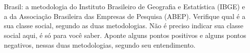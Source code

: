 \chapter{} %

Brasil: a metodologia do Instituto Brasileiro de Geografia e Estatística (IBGE) e a da
Associação Brasileira das Empresas de Pesquisa (ABEP). Verifique qual é a sua classe
social, segundo as duas metodologias. Não é preciso indicar sua classe social aqui, é só
para você saber. Aponte alguns pontos positivos e alguns pontos negativos, nessas duas
metodologias, segundo seu entendimento.